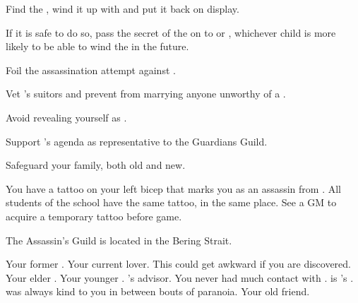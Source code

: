\documentclass[char]{NeptuneBall}
\begin{document}
\begin{itemz}[Goals]
  \item Find the \iMusicBox{}, wind it up with \iMusicBoxKey{} and put it back on display.
  \item If it is safe to do so, pass the secret of the \iMusicBox{} on to \cAriel{} or \cPrincess{}, whichever child is more likely to be able to wind the \iMusicBox{} in the future.
  \item Foil the assassination attempt against \cKing{}.
  \item Vet \cPrincess{}'s suitors and prevent \cPrincess{\them} from marrying anyone unworthy of a \cPrincess{\prince}.
  \item Avoid revealing yourself as \cQueen{\King} \cQueen{}.
	\item Support \cGeneral{}'s agenda as representative to the Guardians Guild.
	\item Safeguard your family, both old and new.
\end{itemz}


\begin{itemz}[Notes]
  \item You have a tattoo on your left bicep that marks you as an assassin from \pAssassin{}. All students of the school have the same tattoo, in the same place. See a GM to acquire a temporary tattoo before game.
\end{itemz}

\begin{itemz}[Trivia]
  \item The Assassin's Guild is located in the Bering Strait.
\end{itemz}

\begin{contacts}
  \contact{\cKing{}} Your former \cKing{\spouse}.
  \contact{\cGeneral{}} Your current lover. This could get awkward if you are discovered.
  \contact{\cAriel{}} Your elder \cAriel{\offspring}.
  \contact{\cPrincess{}} Your younger \cPrincess{{\offspring}}.
  \contact{\cManta{}} \cKing{}'s advisor. You never had much contact with \cManta{\them}.
  \contact{\cPlant{}} \cPlant{} is \cKing{}'s \cPlant{\sibling}. \cPlant{\they} was always kind to you in between bouts of paranoia.
  \contact{\cDiplomat{}} Your old friend.
\end{contacts}
\end{document}
